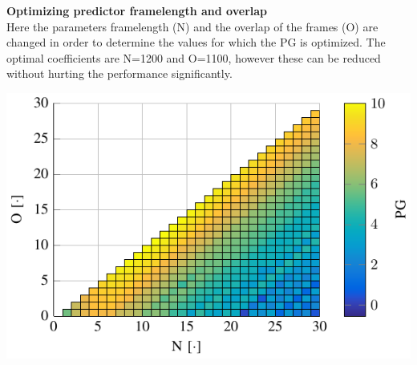 
 \begin{minipage}{.5\columnwidth}
	 	\textbf{Optimizing predictor framelength and overlap}\\
		Here the parameters framelength (N) and the overlap of the frames (O) are changed in order to determine the values for which the PG is optimized. The optimal coefficients are N=1200 and O=1100, however these can be reduced without hurting the performance significantly.
	\label{fig:HammingNOP10}
\end{minipage}%
\begin{minipage}{0.5\columnwidth}
	\includegraphics[width=\textwidth]{figures/HammingNOP10.pdf}
\end{minipage}


